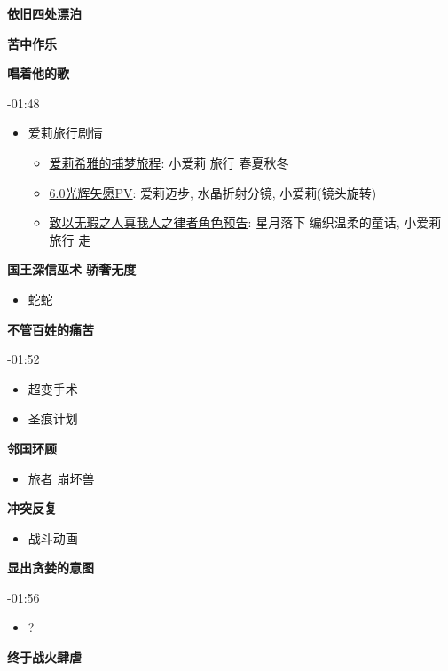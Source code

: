 \documentclass[a4paper]{article}
\begin{document}
\textbf{依旧四处漂泊}

\textbf{苦中作乐}

\textbf{唱着他的歌}

-01:48

\begin{itemize}
    \item 爱莉旅行剧情
    \begin{itemize}
        \item \href{https://www.bilibili.com/video/BV1ZW4y1t7Zf/}{爱莉希雅的捕梦旅程}: 小爱莉 旅行 春夏秋冬
        \item \href{https://www.bilibili.com/video/BV1Mg411k7U5/}{6.0光辉矢愿PV}: 爱莉迈步, 水晶折射分镜, 小爱莉(镜头旋转)
        \item \href{https://www.bilibili.com/video/BV1DS4y1t7rs/}{致以无瑕之人真我人之律者角色预告}: 星月落下 编织温柔的童话, 小爱莉 旅行 走
    \end{itemize}
\end{itemize}

\textbf{国王深信巫术 骄奢无度}

\begin{itemize}
    \item 蛇蛇
\end{itemize}

\textbf{不管百姓的痛苦}

-01:52

\begin{itemize}
    \item 超变手术
    \item 圣痕计划
\end{itemize}

\textbf{邻国环顾}

\begin{itemize}
    \item 旅者 崩坏兽
\end{itemize}

\textbf{冲突反复}

\begin{itemize}
    \item 战斗动画
\end{itemize}

\textbf{显出贪婪的意图}

-01:56

\begin{itemize}
    \item ?
\end{itemize}

\textbf{终于战火肆虐}
\end{document}
